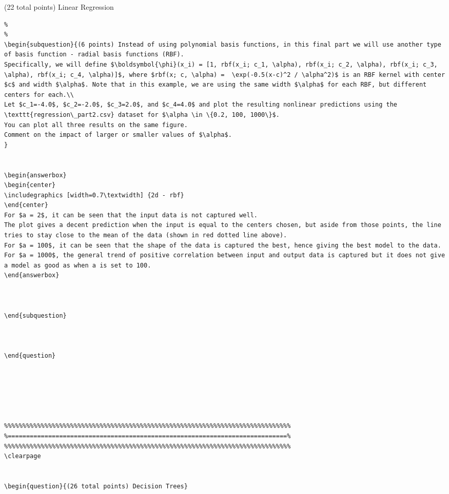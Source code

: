 \documentclass[12pt]{article}
\begin{document}
\begin{question}{(22 total points) Linear Regression}
\begin{subquestion}
\begin{answerbox}{20em}
\begin {verbatim}
%
%
\begin{subquestion}{(6 points) Instead of using polynomial basis functions, in this final part we will use another type of basis function - radial basis functions (RBF). 
Specifically, we will define $\boldsymbol{\phi}(x_i) = [1, rbf(x_i; c_1, \alpha), rbf(x_i; c_2, \alpha), rbf(x_i; c_3, \alpha), rbf(x_i; c_4, \alpha)]$, where $rbf(x; c, \alpha) =  \exp(-0.5(x-c)^2 / \alpha^2)$ is an RBF kernel with center $c$ and width $\alpha$. Note that in this example, we are using the same width $\alpha$ for each RBF, but different centers for each.\\ 
Let $c_1=-4.0$, $c_2=-2.0$, $c_3=2.0$, and $c_4=4.0$ and plot the resulting nonlinear predictions using the \texttt{regression\_part2.csv} dataset for $\alpha \in \{0.2, 100, 1000\}$. 
You can plot all three results on the same figure.
Comment on the impact of larger or smaller values of $\alpha$.
}


\begin{answerbox}{35em}
\begin{center}
\includegraphics [width=0.7\textwidth] {2d - rbf}
\end{center}
For $a = 2$, it can be seen that the input data is not captured well. 
The plot gives a decent prediction when the input is equal to the centers chosen, but aside from those points, the line tries to stay close to the mean of the data (shown in red dotted line above).
For $a = 100$, it can be seen that the shape of the data is captured the best, hence giving the best model to the data.
For $a = 1000$, the general trend of positive correlation between input and output data is captured but it does not give a model as good as when a is set to 100.
\end{answerbox}



\end{subquestion}



\end{question}






\clearpage


\begin{question}{(26 total points) Decision Trees}


\end{verbatim}
\end{answerbox}
\end{subquestion}
\end{question}
\end{document}
